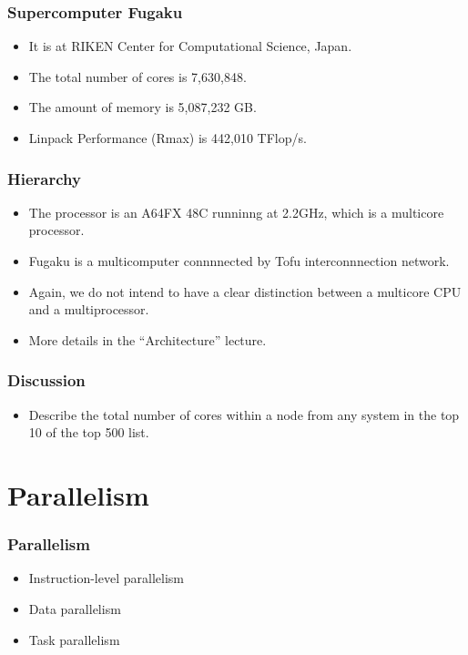\documentclass{beamer}
\begin{document}
\begin{CJK}{UTF8}{bsmi}
  \begin{frame}
    \frametitle{Supercomputer Fugaku}
    \begin{itemize}
    \item It is at RIKEN Center for Computational Science, Japan.
    \item The total number of cores is 7,630,848.
    \item The amount of memory is 5,087,232 GB.
    \item Linpack Performance (Rmax) is 442,010 TFlop/s.
    \end{itemize}
  \end{frame}

\begin{frame}
    \frametitle{Hierarchy}
    \begin{itemize}
    \item The processor is an A64FX 48C runninng at 2.2GHz, which is a multicore processor.
    \item Fugaku is a multicomputer connnnected by Tofu interconnnection network.
    \item Again, we do not intend to have a clear distinction between a
      multicore CPU and a multiprocessor.
    \item More details in the ``Architecture'' lecture.
    \end{itemize}
  \end{frame}

  \begin{frame}
    \frametitle{Discussion} 
    \begin{itemize}
    \item Describe the total number of cores within a node from any
      system in the top 10 of the top 500 list.
    \end{itemize}
  \end{frame}


  \section{Parallelism}

  \begin{frame}
    \frametitle{Parallelism} 
    \begin{itemize}
    \item Instruction-level parallelism
    \item Data parallelism
    \item Task parallelism
    \end{itemize}
  \end{frame}


\end{CJK}
\end{document}
